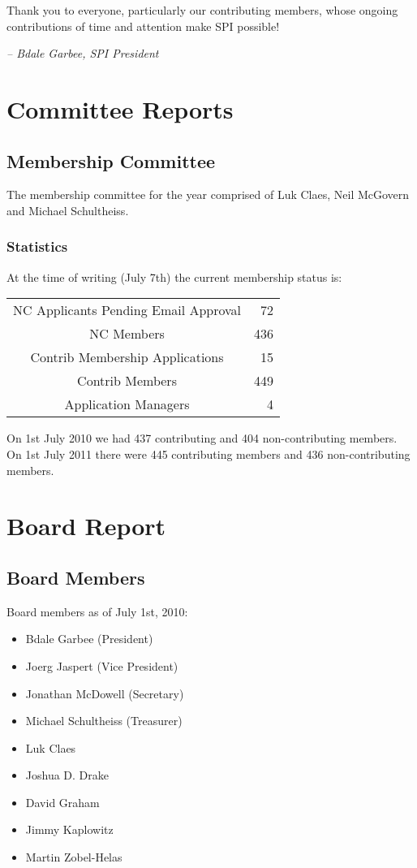 \documentclass[letterpaper]{report}
\begin{document}
Thank you to everyone, particularly our contributing members, whose
ongoing contributions of time and attention make SPI possible!

  \emph{-- Bdale Garbee, SPI President}

\chapter{Committee Reports}
\section{Membership Committee}

The membership committee for the year comprised of Luk Claes, Neil McGovern and
Michael Schultheiss.

\subsection{Statistics}

At the time of writing (July 7th) the current membership status is:

\begin{tabular}{ | c | r | }
\hline
NC Applicants Pending Email Approval	& 72 \\
NC Members				& 436 \\
Contrib Membership Applications		& 15 \\
Contrib Members				& 449 \\
Application Managers			& 4 \\
\hline
\end{tabular}

On 1st July 2010 we had 437 contributing and 404 non-contributing members. On
1st July 2011 there were 445 contributing members and 436 non-contributing
members.

\chapter{Board Report}
\section{Board Members}

Board members as of July 1st, 2010:

\begin{itemize}
\item Bdale Garbee (President)
\item Joerg Jaspert (Vice President)
\item Jonathan McDowell (Secretary)
\item Michael Schultheiss (Treasurer)
\item Luk Claes
\item Joshua D. Drake
\item David Graham
\item Jimmy Kaplowitz
\item Martin Zobel-Helas
\end{itemize}
\end{document}
